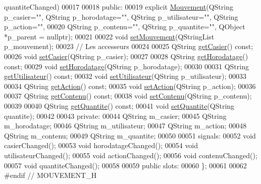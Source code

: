 \begin{DoxyCode}
      quantiteChanged)
00017 
00018 public:
00019     explicit \hyperlink{class_mouvement}{Mouvement}(QString p\_casier="", QString p\_horodatage="", QString p\_utilisateur="", 
      QString p\_action="",
00020                        QString p\_contenu="", QString p\_quantite="", QObject *p\_parent = \textcolor{keywordtype}{nullptr});
00021 
00022     \textcolor{keywordtype}{void} \hyperlink{class_mouvement_a5c7f0e876b2292627e9d1bef12de03a3}{setMouvement}(QStringList p\_mouvement);
00023     \textcolor{comment}{// Les accesseurs}
00024 
00025     QString \hyperlink{class_mouvement_ae3ebc2911605104452a612aaf8a48e64}{getCasier}() const;
00026     \textcolor{keywordtype}{void} \hyperlink{class_mouvement_ad47317b7671e3b9b7e6e060f667924a7}{setCasier}(QString p\_casier);
00027 
00028     QString \hyperlink{class_mouvement_ab6990fd5ea6c47ab3fb6a8a4944c2df9}{getHorodatage}() const;
00029     \textcolor{keywordtype}{void} \hyperlink{class_mouvement_ab0bd90180d06f2ed37fb2b796f31aeb8}{setHorodatage}(QString p\_horodatage);
00030 
00031     QString \hyperlink{class_mouvement_a80c65d0cba3e7918f7112fd7f85a1471}{getUtilisateur}() const;
00032     \textcolor{keywordtype}{void} \hyperlink{class_mouvement_abd38b265d54e55a4dd897e3270141a84}{setUtilisateur}(QString p\_utilisateur);
00033 
00034     QString \hyperlink{class_mouvement_a683576b69fc9ab0bef8b85b1468408e2}{getAction}() const;
00035     \textcolor{keywordtype}{void} \hyperlink{class_mouvement_a2c64d36ea78ea6b428ddd0a0610411c1}{setAction}(QString p\_action);
00036 
00037     QString \hyperlink{class_mouvement_a6a288ea183789e4b99f6f520ff7a32ab}{getContenu}() const;
00038     \textcolor{keywordtype}{void} \hyperlink{class_mouvement_a07e3d77c7d7af6a74e3ac5e7eb195ff9}{setContenu}(QString p\_contenu);
00039 
00040     QString \hyperlink{class_mouvement_a427e1320936bfaf09ca0b2c42ae9dd98}{getQuantite}() const;
00041     \textcolor{keywordtype}{void} \hyperlink{class_mouvement_aa9ed36b12cb4c46f851682d630cc28f8}{setQuantite}(QString quantite);
00042 
00043 private:
00044     QString m\_casier;
00045     QString m\_horodatage;
00046     QString m\_utilisateur;
00047     QString m\_action;
00048     QString m\_contenu;
00049     QString m\_quantite;
00050 
00051 signals:
00052     \textcolor{keywordtype}{void} casierChanged();
00053     \textcolor{keywordtype}{void} horodatageChanged();
00054     \textcolor{keywordtype}{void} utilisateurChanged();
00055     \textcolor{keywordtype}{void} actionChanged();
00056     \textcolor{keywordtype}{void} contenuChanged();
00057     \textcolor{keywordtype}{void} quantiteChanged();
00058 
00059 public slots:
00060 \};
00061 
00062 \textcolor{preprocessor}{#endif // MOUVEMENT\_H}
\end{DoxyCode}
